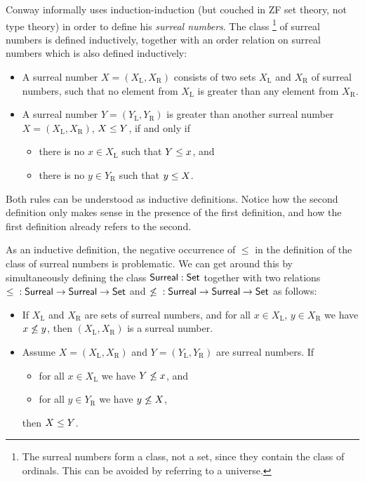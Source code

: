 \documentclass{article}
\begin{document}
\begin{example}
\label{ex:surreal}

Conway \cite{conway2001ONAG} informally uses induction-induction (but
couched in ZF set theory, not type theory) in order to define his
\emph{surreal numbers}. The class \footnote{The surreal numbers form a
  class, not a set, since they contain the class of ordinals. This can
  be avoided by referring to a universe.} of surreal numbers is
defined inductively, together with an order relation on surreal
numbers which is also defined inductively:

\begin{itemize}
\item A surreal number $X = (X_\mathrm{L}, X_\mathrm{R})$ consists of
  two sets $X_\mathrm{L}$ and $X_\mathrm{R}$ of surreal numbers, such
  that no element from $X_\mathrm{L}$ is greater than any element from
  $X_\mathrm{R}$.
\item A surreal number $Y = (Y_\mathrm{L}, Y_\mathrm{R})$ is greater
  than another surreal number $X = (X_\mathrm{L}, X_\mathrm{R})$, $X \leq Y$, if and
  only if
  \begin{itemize}
  \item there is no $x \in X_\mathrm{L}$ such that $Y \leq x$, and
  \item there is no $y \in Y_\mathrm{R}$ such that $y \leq X$.
  \end{itemize}
\end{itemize}

Both rules can be understood as inductive definitions. Notice how the
second definition only makes sense in the presence of the first
definition, and how the first definition already refers to the second.

As an inductive definition, the negative occurrence of $\leq$ in the
definition of the class of surreal numbers is problematic. We can get
around this by simultaneously defining the class $\mathsf{Surreal} : \mathsf{Set}$
together with two relations ${ \leq {} : \mathsf{Surreal} \to \mathsf{Surreal} \to \mathsf{Set}}$ and
${ \not\leq {} : \mathsf{Surreal} \to \mathsf{Surreal} \to \mathsf{Set}}$ as follows:

\begin{itemize}
\item If $X_\mathrm{L}$ and $X_\mathrm{R}$ are sets of surreal
  numbers, and for all $x \in X_\mathrm{L}$, $y \in X_\mathrm{R}$ we
  have $x \not\leq y$, then $(X_\mathrm{L}, X_\mathrm{R})$ is a surreal number.

\item Assume $X = (X_\mathrm{L}, X_\mathrm{R})$ and $Y = (Y_\mathrm{L}, Y_\mathrm{R})$ are surreal numbers.
 If 
 \begin{itemize}
 \item for all $x \in X_\mathrm{L}$ we have $Y \not\leq x$, and
 \item for all $y \in Y_\mathrm{R}$ we have $y \not\leq X$,
 \end{itemize}
then $X \leq Y$.


\end{itemize}
\end{example}
\end{document}
